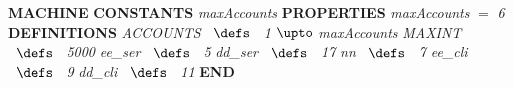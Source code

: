 %
\bsetindent
\begin{tabbing}
\bSetTabs
%
%
\bbnl
{\bf MACHINE} \bhsp{} \-\label{Globals}
%
%
\bbnl
{\bf CONSTANTS} \+ \bbnl
{\em maxAccounts\/}\label{maxAccounts}  \-
%
%
\bbnl
{\bf PROPERTIES} \+ \bbnl
{\em maxAccounts\/} $=$ {\em 6\/} \-
%
%
\bbnl
{\bf DEFINITIONS} \+ \bbnl
{\em ACCOUNTS\/}\label{ACCOUNTS}  $\;\;\defs\;\;$ {\em 1\/} $\upto$ {\em maxAccounts\/} \bStatementSemiColon \bnl
{\em MAXINT\/}\label{MAXINT}  $\;\;\defs\;\;$ {\em 5000\/} \bStatementSemiColon \bnl
{\em ee\_ser\/}\label{ee_ser}  $\;\;\defs\;\;$ {\em 5\/} \bStatementSemiColon \bnl
{\em dd\_ser\/}\label{dd_ser}  $\;\;\defs\;\;$ {\em 17\/} \bStatementSemiColon \bnl
{\em nn\/}\label{nn}  $\;\;\defs\;\;$ {\em 7\/} \bStatementSemiColon \bnl
{\em ee\_cli\/}\label{ee_cli}  $\;\;\defs\;\;$ {\em 9\/} \bStatementSemiColon \bnl
{\em dd\_cli\/}\label{dd_cli}  $\;\;\defs\;\;$ {\em 11\/} \-
%
%
\bbnl
{\bf END} 
\end{tabbing}
\bresetindent

